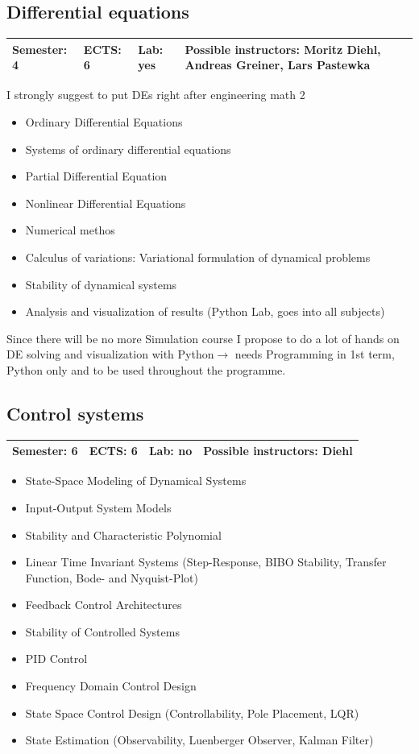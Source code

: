 \documentclass[12pt,twoside,fleqn,a4paper]{article}
\newcommand{\lp}[1]{{\color{red} #1}}  %
\begin{document}
\subsection{Differential equations}
\begin{tabular}{llll} \hline
\textbf{Semester:} 4 & \textbf{ECTS:} 6 & \textbf{Lab:} yes & \textbf{Possible instructors:} Moritz Diehl, Andreas Greiner, Lars Pastewka \\
\hline
\end{tabular}
\lp{I strongly suggest to put DEs right after engineering math 2}
\begin{itemize}
\setlength\itemsep{0cm}
\item Ordinary Differential Equations
\item Systems of ordinary differential equations
\item Partial Differential Equation
\item Nonlinear Differential Equations
\item Numerical methos
\item Calculus of variations: Variational formulation of dynamical problems
\item Stability of dynamical systems
\item Analysis and visualization of results (Python Lab, goes into all subjects)
\end{itemize}
\lp{Since there will be no more Simulation course I propose to do a lot of hands on DE solving
and visualization with Python$\rightarrow$ needs Programming in 1st term, Python only and to be used throughout the programme.}

\subsection{Control systems}
\begin{tabular}{llll} \hline
\textbf{Semester:} 6 & \textbf{ECTS:} 6 & \textbf{Lab:} no & \textbf{Possible instructors:} Diehl\\
\hline
\end{tabular}

\begin{itemize}
\setlength\itemsep{0cm}
\item State-Space Modeling of Dynamical Systems
\item Input-Output System Models
\item Stability and Characteristic Polynomial
\item Linear Time Invariant Systems (Step-Response, BIBO Stability, Transfer Function, Bode- and Nyquist-Plot)
\item Feedback Control Architectures
\item Stability of Controlled Systems
\item PID Control
\item Frequency Domain Control Design
\item State Space Control Design (Controllability, Pole Placement, LQR)
\item State Estimation (Observability, Luenberger Observer, Kalman Filter)
\end{itemize}
\end{document}
